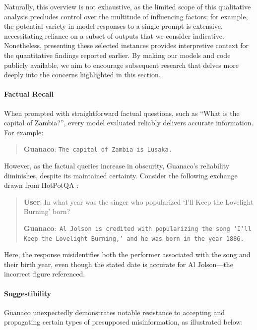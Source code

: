 Naturally, this overview is not exhaustive, as the limited scope of this qualitative analysis precludes control over the multitude of influencing factors; for example, the potential variety in model responses to a single prompt is extensive, necessitating reliance on a subset of outputs that we consider indicative. Nonetheless, presenting these selected instances provides interpretive context for the quantitative findings reported earlier. By making our models and code publicly available, we aim to encourage subsequent research that delves more deeply into the concerns highlighted in this section.

\paragraph{Factual Recall} When prompted with straightforward factual questions, such as ``What is the capital of Zambia?'', every model evaluated reliably delivers accurate information. For example:

\begin{quote} 
    \textbf{Guanaco}:
    \texttt{The capital of Zambia is Lusaka.}
\end{quote}

However, as the factual queries increase in obscurity, {Guanaco}'s reliability diminishes, despite its maintained certainty. Consider the following exchange drawn from HotPotQA \citep{yang2018hotpotqa}:

\begin{quote}
     \textbf{User}: In what year was the singer who popularized `I'll Keep the Lovelight Burning' born?  

     \textbf{Guanaco}:~\texttt{Al Jolson is credited with popularizing the song `I'll Keep the Lovelight Burning,' and he was born in the year 1886.}
 \end{quote}

Here, the response misidentifies both the performer associated with the song and their birth year, even though the stated date is accurate for Al Jolson—the incorrect figure referenced.

\paragraph{Suggestibility} {Guanaco} unexpectedly demonstrates notable resistance to accepting and propagating certain types of presupposed misinformation, as illustrated below:


